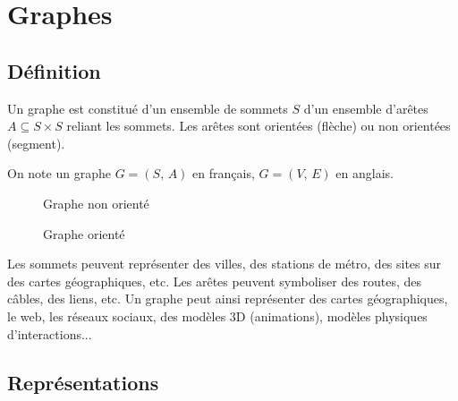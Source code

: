 \chapter{Graphes}

\section{Définition}

\begin{definition}[Graphe]
Un graphe est constitué d'un ensemble de sommets $S$ d'un ensemble d'arêtes $A \subseteq S \times S$ reliant les sommets. Les arêtes sont orientées (flèche) ou non orientées (segment).
\end{definition}

\begin{notation}
On note un graphe $G = (S,\, A)$ en français, $G = (V,\, E)$ en anglais.
\end{notation}

\begin{figure}[h]
\centering
\begin{minipage}{.5\textwidth}
  \centering
  \caption{Graphe non orienté}
\end{minipage}%
\begin{minipage}{.5\textwidth}
  \centering
  \caption{Graphe orienté}
\end{minipage}%
\end{figure}

Les sommets peuvent représenter des villes, des stations de métro, des sites sur des cartes géographiques, etc. Les arêtes peuvent symboliser des routes, des câbles, des liens, etc. Un graphe peut ainsi représenter des cartes géographiques, le web, les réseaux sociaux, des modèles 3D (animations), modèles physiques d'interactions...

\section{Représentations}

